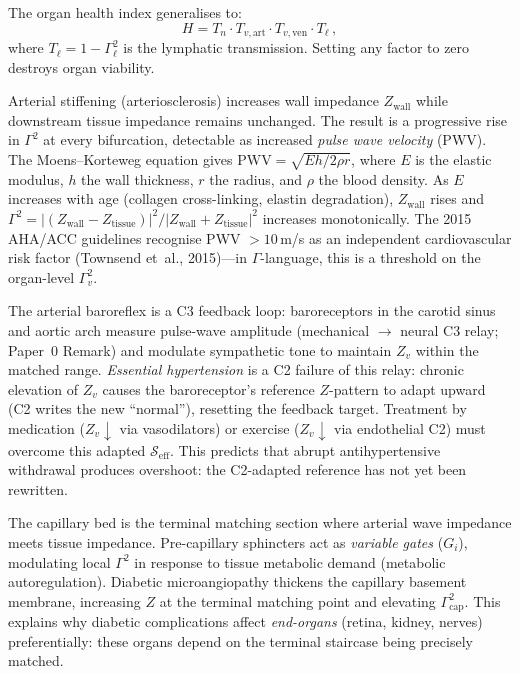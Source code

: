 \documentclass[aps,pre,twocolumn,superscriptaddress,floatfix]{revtex4-2}
\begin{document}
The organ health index generalises to:
\begin{equation}
  H = T_n \cdot T_{v,\text{art}} \cdot
      T_{v,\text{ven}} \cdot T_{\ell}\,,
  \label{eq:tri-health}
\end{equation}
where $T_{\ell} = 1 - \Gamma_{\ell}^2$ is the
lymphatic transmission.
Setting any factor to zero destroys organ viability.

\begin{remark}
\label{rem:arterial-stiffening}
Arterial stiffening (arteriosclerosis) increases wall
impedance $Z_{\text{wall}}$ while downstream tissue
impedance remains unchanged.
The result is a progressive rise in $\Gamma^2$ at
every bifurcation, detectable as increased
\emph{pulse wave velocity} (PWV).
The Moens--Korteweg equation gives
$\text{PWV} = \sqrt{E h / 2 \rho r}$,
where $E$ is the elastic modulus,
$h$ the wall thickness, $r$ the radius,
and $\rho$ the blood density.
As $E$ increases with age (collagen cross-linking,
elastin degradation), $Z_{\text{wall}}$ rises and
$\Gamma^2 = |(Z_{\text{wall}} - Z_{\text{tissue}})|^2
/ |Z_{\text{wall}} + Z_{\text{tissue}}|^2$ increases
monotonically.
The 2015 AHA/ACC guidelines recognise
PWV $> 10$\,m/s as an independent cardiovascular
risk factor (Townsend et~al., 2015)---in
$\Gamma$-language, this is a threshold on the
organ-level $\Gamma^2_{v}$.
\end{remark}

\begin{remark}
\label{rem:hypertension}
The arterial baroreflex is a C3 feedback loop:
baroreceptors in the carotid sinus and aortic arch
measure pulse-wave amplitude
(mechanical $\to$ neural C3 relay;
Paper~0 Remark)
and modulate sympathetic tone to maintain $Z_v$
within the matched range.
\emph{Essential hypertension} is a C2 failure
of this relay: chronic elevation of $Z_v$
causes the baroreceptor's reference $Z$-pattern
to adapt upward (C2 writes the new ``normal''),
resetting the feedback target.
Treatment by medication ($Z_v \downarrow$ via
vasodilators) or exercise ($Z_v \downarrow$ via
endothelial C2) must overcome this adapted
$\mathcal{S}_{\text{eff}}$.
This predicts that abrupt antihypertensive
withdrawal produces overshoot: the C2-adapted
reference has not yet been rewritten.
\end{remark}

\begin{remark}
\label{rem:microcirculation}
The capillary bed is the terminal matching section
where arterial wave impedance meets tissue impedance.
Pre-capillary sphincters act as \emph{variable gates}
($G_i$), modulating local $\Gamma^2$ in response to
tissue metabolic demand (metabolic autoregulation).
Diabetic microangiopathy thickens the capillary
basement membrane, increasing $Z$ at the terminal
matching point and elevating $\Gamma^2_{\text{cap}}$.
This explains why diabetic complications affect
\emph{end-organs} (retina, kidney, nerves)
preferentially: these organs depend on the
terminal staircase being precisely matched.
\end{remark}
\end{document}

